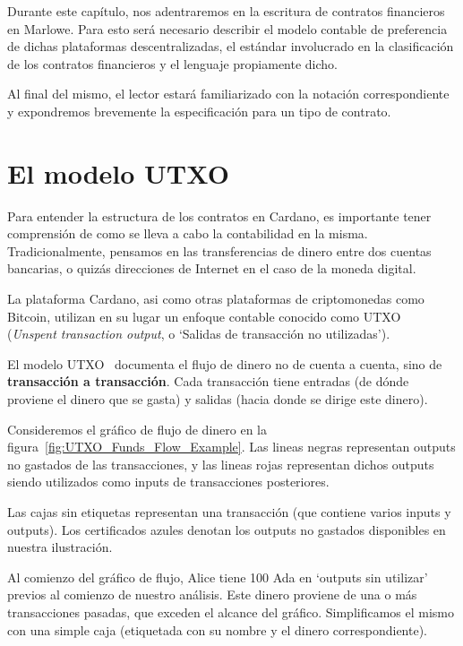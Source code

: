 \documentclass[12pt]{book}
\begin{document}
Durante este capítulo, nos adentraremos en la escritura de contratos financieros en Marlowe. Para esto será necesario describir el modelo contable de preferencia de dichas plataformas descentralizadas, el estándar involucrado en la clasificación de los contratos financieros y el lenguaje propiamente dicho.

Al final del mismo, el lector estará familiarizado con la notación correspondiente y expondremos brevemente la especificación para un tipo de contrato.

\section{El modelo UTXO}\label{sec:UTXO}

Para entender la estructura de los contratos en Cardano, es importante tener comprensión de como se lleva a cabo la contabilidad en la misma.
Tradicionalmente, pensamos en las transferencias de dinero entre dos cuentas bancarias, o quizás direcciones de Internet en el caso de la moneda digital.

La plataforma Cardano, asi como otras plataformas de criptomonedas como Bitcoin, utilizan en su lugar un enfoque contable conocido como UTXO~\cite{cardano_utxo_ledger} (\textit{Unspent transaction output}, o `Salidas de transacción no utilizadas').

El modelo UTXO~\cite{Translating_and_Unifying_UTXO-based, UTxO_Lars} documenta el flujo de dinero no de cuenta a cuenta, sino de \textbf{transacción a transacción}. Cada transacción tiene entradas (de dónde proviene el dinero que se gasta) y salidas (hacia donde se dirige este dinero).

Consideremos el gráfico de flujo de dinero en la figura~\ref{fig:UTXO_Funds_Flow_Example}. Las lineas negras representan outputs no gastados de las transacciones, y las lineas rojas representan dichos outputs siendo utilizados como inputs de transacciones posteriores.

Las cajas sin etiquetas representan una transacción (que contiene varios inputs y outputs). Los certificados azules denotan los outputs no gastados disponibles en nuestra ilustración.

Al comienzo del gráfico de flujo, Alice tiene 100 Ada en `outputs sin utilizar' previos al comienzo de nuestro análisis. Este dinero proviene de una o más transacciones pasadas, que exceden el alcance del gráfico. Simplificamos el mismo con una simple caja (etiquetada con su nombre y el dinero correspondiente).
\end{document}

